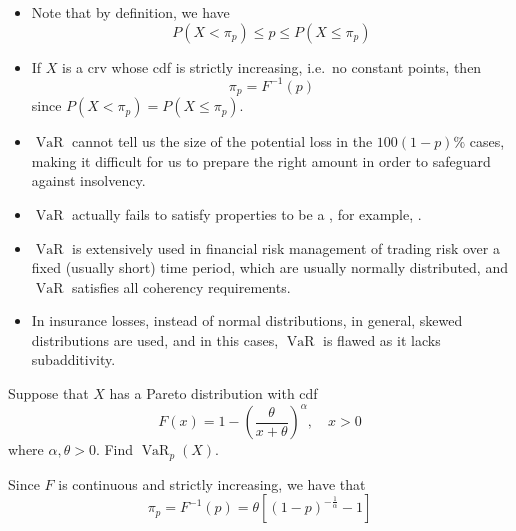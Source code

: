 \documentclass[notoc,notitlepage]{tufte-book}
\DeclareMathOperator{\VaR}{VaR}
\begin{document}
\begin{note}
  \begin{itemize}
    \item Note that by definition, we have
      \begin{equation*}
        P(X < \pi_p) \leq p \leq P(X \leq \pi_p)
      \end{equation*}
    \item If $X$ is a crv whose cdf is strictly increasing, i.e.\ no constant points, then
      \begin{equation*}
        \pi_p = F^{-1}(p)
      \end{equation*}
      since $P(X < \pi_p) = P(X \leq \pi_p)$.
  \end{itemize}
\end{note}

\begin{warning}[Shortcomings of $\VaR$]
  \begin{itemize}
    \item $\VaR$ cannot tell us the size of the potential loss in the $100(1 - p)\%$ cases, making it difficult for us to prepare the right amount in order to safeguard against insolvency.
    \item $\VaR$ actually fails to satisfy properties to be a , for example, .
    \item $\VaR$ is extensively used in financial risk management of trading risk over a fixed (usually short) time period, which are usually normally distributed, and $\VaR$ satisfies all coherency requirements.
    \item In insurance losses, instead of normal distributions, in general, skewed distributions are used, and in this cases, $\VaR$ is flawed as it lacks subadditivity.
  \end{itemize}
\end{warning}

\begin{eg}\label{eg:varp_pareto}
  Suppose that $X$ has a Pareto distribution with cdf
  \begin{equation*}
    F(x) = 1 - {\left( \frac{\theta}{x + \theta} \right)}^\alpha , \quad x > 0
  \end{equation*}
  where $\alpha, \theta > 0$. Find $\VaR_p(X)$.
\end{eg}

\begin{solution}
  Since $F$ is continuous and strictly increasing, we have that
  \begin{equation*}
    \pi_p = F^{-1}(p) = \theta \left[ {(1 - p)}^{-\frac{1}{\alpha}} - 1 \right]
  \end{equation*}
\end{solution}
\end{document}

